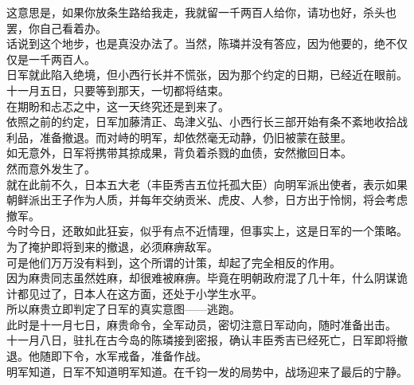\begin{multicols}{\theparacolNo}
这意思是，如果你放条生路给我走，我就留一千两百人给你，请功也好，杀头也罢，你自己看着办。\\

话说到这个地步，也是真没办法了。当然，陈璘并没有答应，因为他要的，绝不仅仅是一千两百人。\\

日军就此陷入绝境，但小西行长并不慌张，因为那个约定的日期，已经近在眼前。\\

十一月五日，只要等到那天，一切都将结束。\\

在期盼和忐忑之中，这一天终究还是到来了。\\

依照之前的约定，日军加藤清正、岛津义弘、小西行长三部开始有条不紊地收拾战利品，准备撤退。而对峙的明军，却依然毫无动静，仍旧被蒙在鼓里。\\

如无意外，日军将携带其掠成果，背负着杀戮的血债，安然撤回日本。\\

然而意外发生了。\\

就在此前不久，日本五大老（丰臣秀吉五位托孤大臣）向明军派出使者，表示如果朝鲜派出王子作为人质，并每年交纳贡米、虎皮、人参，日方出于怜悯，将会考虑撤军。\\

今时今日，还敢如此狂妄，似乎有点不近情理，但事实上，这是日军的一个策略。为了掩护即将到来的撤退，必须麻痹敌军。\\

可是他们万万没有料到，这个所谓的计策，却起了完全相反的作用。\\

因为麻贵同志虽然姓麻，却很难被麻痹。毕竟在明朝政府混了几十年，什么阴谋诡计都见过了，日本人在这方面，还处于小学生水平。\\

所以麻贵立即判定了日军的真实意图——逃跑。\\

此时是十一月七日，麻贵命令，全军动员，密切注意日军动向，随时准备出击。\\

十一月八日，驻扎在古今岛的陈璘接到密报，确认丰臣秀吉已经死亡，日军即将撤退。他随即下令，水军戒备，准备作战。\\

明军知道，日军不知道明军知道。在千钧一发的局势中，战场迎来了最后的宁静。\\


\end{multicols}
